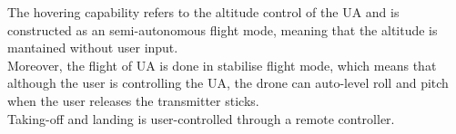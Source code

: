 \noindent The hovering capability refers to the altitude control of the UA and is constructed as an semi-autonomous flight mode, meaning that the altitude is mantained without user input.\\

\noindent Moreover, the flight of UA is done in stabilise flight mode, which means that although the user is controlling the UA, the drone can auto-level roll and pitch when the user releases the transmitter sticks.\\

\noindent Taking-off and landing is user-controlled through a remote controller.

